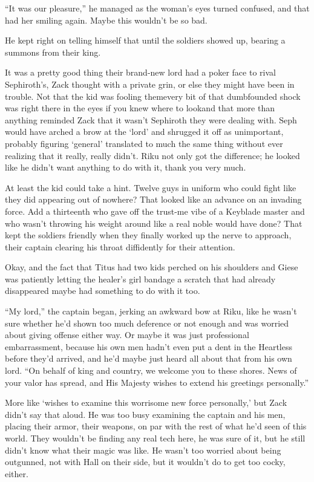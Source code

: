 ``It was our pleasure,'' he managed as the woman's eyes turned confused, and that had her smiling again. Maybe this wouldn't be so bad.

He kept right on telling himself that until the soldiers showed up, bearing a summons from their king.


\scenechange


It was a pretty good thing their brand-new lord had a poker face to rival Sephiroth's, Zack thought with a private grin, or else they might have been in trouble. Not that the kid was fooling them\textemdash every bit of that dumbfounded shock was right there in the eyes if you knew where to look\textemdash and that more than anything reminded Zack that it wasn't Sephiroth they were dealing with. Seph would have arched a brow at the `lord' and shrugged it off as unimportant, probably figuring `general' translated to much the same thing without ever realizing that it really, really didn't. Riku not only got the difference; he looked like he didn't want anything to do with it, thank you very much.

At least the kid could take a hint. Twelve guys in uniform who could fight like they did appearing out of nowhere? That looked like an advance on an invading force. Add a thirteenth who gave off the trust-me vibe of a Keyblade master and who wasn't throwing his weight around like a real noble would have done? That kept the soldiers friendly when they finally worked up the nerve to approach, their captain clearing his throat diffidently for their attention.

Okay, and the fact that Titus had two kids perched on his shoulders and Giese was patiently letting the healer's girl bandage a scratch that had already disappeared maybe had something to do with it too.

``My lord,'' the captain began, jerking an awkward bow at Riku, like he wasn't sure whether he'd shown too much deference or not enough and was worried about giving offense either way. Or maybe it was just professional embarrassment, because his own men hadn't even put a dent in the Heartless before they'd arrived, and he'd maybe just heard all about that from his own lord. ``On behalf of king and country, we welcome you to these shores. News of your valor has spread, and His Majesty wishes to extend his greetings personally.''

More like `wishes to examine this worrisome new force personally,' but Zack didn't say that aloud. He was too busy examining the captain and his men, placing their armor, their weapons, on par with the rest of what he'd seen of this world. They wouldn't be finding any real tech here, he was sure of it, but he still didn't know what their magic was like. He wasn't too worried about being outgunned, not with Hall on their side, but it wouldn't do to get too cocky, either.

